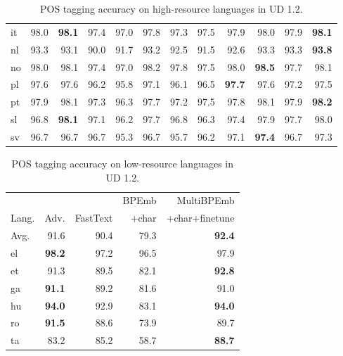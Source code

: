 \documentclass[11pt,a4paper]{article}
\begin{document}
\begin{table*}
\begin{adjustbox}{max width=\linewidth}
\begin{tabular}{lrrr|rrr|rrr|rr}
it & 98.0 & \textbf{98.1} & 97.4 & 97.0 & 97.8 & 97.3 & 97.5 & 97.9 & 98.0 & 97.9 & \textbf{98.1}\\
nl & 93.3 & 93.1 & 90.0 & 91.7 & 93.2 & 92.5 & 91.5 & 92.6 & 93.3 & 93.3 & \textbf{93.8}\\
no & 98.0 & 98.1 & 97.4 & 97.0 & 98.2 & 97.8 & 97.5 & 98.0 & \textbf{98.5} & 97.7 & 98.1\\
pl & 97.6 & 97.6 & 96.2 & 95.8 & 97.1 & 96.1 & 96.5 & \textbf{97.7} & 97.6 & 97.2 & 97.5\\
pt & 97.9 & 98.1 & 97.3 & 96.3 & 97.7 & 97.2 & 97.5 & 97.8 & 98.1 & 97.9 & \textbf{98.2}\\
sl & 96.8 & \textbf{98.1} & 97.1 & 96.2 & 97.7 & 96.8 & 96.3 & 97.4 & 97.9 & 97.7 & 98.0\\
sv & 96.7 & 96.7 & 96.7 & 95.3 & 96.7 & 95.7 & 96.2 & 97.1 & \textbf{97.4} & 96.7 & 97.3\\
\bottomrule
\end{tabular}
 	\end{adjustbox}
	\caption{POS tagging accuracy on high-resource languages in UD 1.2.}
	\label{tbl:ud-results-all}
\end{table*}

\begin{table}
	\centering
	\small
	\begin{adjustbox}{max width=\linewidth}
		\begin{tabular}{lrr|r|r}
\toprule

 & & & BPEmb & MultiBPEmb \\
Lang. & Adv. & FastText & +char & +char+finetune \\

\midrule
Avg. & 91.6 & 90.4 & 79.3 & \textbf{92.4}\\
\midrule
el & \textbf{98.2} & 97.2 & 96.5 & 97.9\\
et & 91.3 & 89.5 & 82.1 & \textbf{92.8}\\
ga & \textbf{91.1} & 89.2 & 81.6 & 91.0\\
hu & \textbf{94.0} & 92.9 & 83.1 & \textbf{94.0}\\
ro & \textbf{91.5} & 88.6 & 73.9 & 89.7\\
ta & 83.2 & 85.2 & 58.7 & \textbf{88.7}\\
\bottomrule
\end{tabular}
 	\end{adjustbox}
	\caption{POS tagging accuracy on low-resource languages in UD 1.2.}
	\label{tbl:ud-results-lowres}
\end{table}
\end{document}
